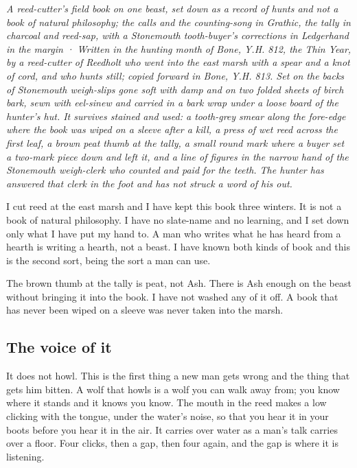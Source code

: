 \documentclass{design/chronicle}
\begin{document}
\clearpage{}
{\centering\FellFont\itshape\footnotesize\color{faded} A reed-cutter’s field book on one beast, set down as a record of hunts and not a book of natural philosophy; the calls and the counting-song in Grathic, the tally in charcoal and reed-sap, with a Stonemouth tooth-buyer’s corrections in Ledgerhand in the margin · Written in the hunting month of Bone, Y.H. 812, the Thin Year, by a reed-cutter of Reedholt who went into the east marsh with a spear and a knot of cord, and who hunts still; copied forward in Bone, Y.H. 813. Set on the backs of Stonemouth weigh-slips gone soft with damp and on two folded sheets of birch bark, sewn with eel-sinew and carried in a bark wrap under a loose board of the hunter’s hut. It survives stained and used: a tooth-grey smear along the fore-edge where the book was wiped on a sleeve after a kill, a press of wet reed across the first leaf, a brown peat thumb at the tally, a small round mark where a buyer set a two-mark piece down and left it, and a line of figures in the narrow hand of the Stonemouth weigh-clerk who counted and paid for the teeth. The hunter has answered that clerk in the foot and has not struck a word of his out.\par}\medskip
I cut reed at the east marsh and I have kept this book three winters. It is not a book of natural philosophy. I have no slate-name and no learning, and I set down only what I have put my hand to. A man who writes what he has heard from a hearth is writing a hearth, not a beast. I have known both kinds of book and this is the second sort, being the sort a man can use.

The brown thumb at the tally is peat, not Ash. There is Ash enough on the beast without bringing it into the book. I have not washed any of it off. A book that has never been wiped on a sleeve was never taken into the marsh.

\subsection*{The voice of it}

It does not howl. This is the first thing a new man gets wrong and the thing that gets him bitten. A wolf that howls is a wolf you can walk away from; you know where it stands and it knows you know. The mouth in the reed makes a low clicking with the tongue, under the water’s noise, so that you hear it in your boots before you hear it in the air. It carries over water as a man’s talk carries over a floor. Four clicks, then a gap, then four again, and the gap is where it is listening.
\end{document}
